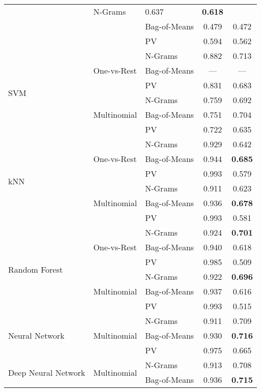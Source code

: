 \begin{table}[h]
\begin{center}
\begin{tabular}{ lll cc }
       & N-Grams & 0.637 & \textbf{0.618} \\
       & & Bag-of-Means & 0.479 & 0.472 \\
       & & PV & 0.594 & 0.562 \\
      \midrule
      \multirow{6}{*}{SVM}
       & \multirow{3}{*}{One-vs-Rest}
         & N-Grams & 0.882 & 0.713 \\
       & & Bag-of-Means & --- & --- \\
       & & PV & 0.831 & 0.683 \\
       \cmidrule(r){2-5}
       & \multirow{3}{*}{Multinomial}
         & N-Grams & 0.759 & 0.692 \\
       & & Bag-of-Means & 0.751 & 0.704 \\
       & & PV & 0.722 & 0.635 \\
      \midrule
      \multirow{6}{*}{kNN}
      & \multirow{3}{*}{One-vs-Rest}
      & N-Grams & 0.929 & 0.642 \\
      & & Bag-of-Means & 0.944 & \textbf{0.685} \\
      & & PV & 0.993 & 0.579 \\
      \cmidrule(r){2-5}
      & \multirow{3}{*}{Multinomial}
      & N-Grams & 0.911 & 0.623 \\
      & & Bag-of-Means & 0.936 & \textbf{0.678} \\
      & & PV & 0.993 & 0.581 \\
      \midrule
      \multirow{6}{*}{Random Forest}
      & \multirow{3}{*}{One-vs-Rest}
      & N-Grams & 0.924 & \textbf{0.701} \\
      & & Bag-of-Means & 0.940 & 0.618 \\
      & & PV & 0.985 & 0.509 \\
      \cmidrule(r){2-5}
      & \multirow{3}{*}{Multinomial}
      & N-Grams & 0.922 & \textbf{0.696} \\
      & & Bag-of-Means & 0.937 & 0.616 \\
      & & PV & 0.993 & 0.515 \\
      \midrule
      \multirow{3}{*}{Neural Network}
      & \multirow{3}{*}{Multinomial}
      & N-Grams & 0.911 & 0.709 \\
      & & Bag-of-Means & 0.930 & \textbf{0.716} \\
      & & PV & 0.975 & 0.665 \\
      \midrule
      \multirow{3}{*}{Deep Neural Network}
      & \multirow{3}{*}{Multinomial}
      & N-Grams & 0.913 & 0.708 \\
      & & Bag-of-Means & 0.936 & \textbf{0.715} \\

\end{tabular}
\end{center}
\end{table}

